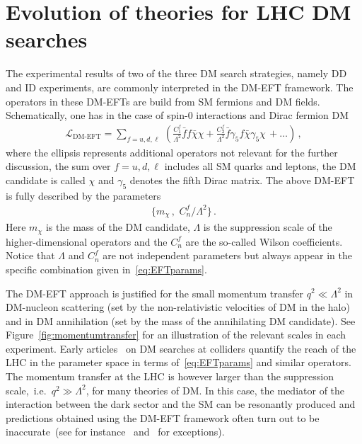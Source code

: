 \documentclass[a4paper, 11pt,notoc]{article}
\begin{document}

\section{Evolution of theories for LHC DM searches} 
\label{sec:evolution}

The experimental results of two of the three DM search strategies, namely DD and ID experiments, are commonly interpreted in the DM-EFT framework. The operators in these DM-EFTs are build from SM fermions and DM fields. Schematically, one has in the case of spin-0 interactions and Dirac fermion DM
\begin{align}\label{eq:EFT}
\mathcal{L}_\text{DM-EFT}= \sum_{f=u, d, \ell} \,\left(\frac{C_{1}^f}{\Lambda^2} \bar f f \bar \chi \chi  +\frac{C_{2}^f}{\Lambda^2} \bar  f \gamma_5 f \bar \chi\gamma_5 \chi \,+\ldots \right) \,, 
\end{align}
 where the ellipsis represents additional operators not relevant for the further discussion, the sum over $f=u,d,\ell$ includes all SM quarks and leptons, the DM candidate is called $\chi$  and $\gamma_5$ denotes the fifth Dirac matrix. The above DM-EFT is fully described by the parameters
\begin{align}\label{eq:EFTparams}
\big\{ m_\chi\,,\,\, C_n^f/\Lambda^2 \big\} \,.
\end{align}
Here $m_\chi$ is the mass of the DM candidate, $\Lambda$ is the suppression scale of the higher-dimensional operators and the $C_n^f$ are the so-called Wilson coefficients. Notice that $\Lambda$ and $C_n^f$ are not independent parameters but always appear in the specific combination given in~\eqref{eq:EFTparams}. 

The DM-EFT approach is justified for the small momentum transfer $q^2\ll \Lambda^2$ in DM-nucleon scattering (set by the non-relativistic velocities of DM in the halo) and in DM annihilation (set by the mass of the annihilating DM candidate). See Figure~\ref{fig:momentumtransfer} for an illustration of the relevant scales in each experiment. Early articles~\cite{Cao:2009uw,Beltran:2010ww,Goodman:2010yf,Bai:2010hh,Goodman:2010ku,Fox:2011pm} on DM searches at colliders quantify the reach of the LHC in the parameter space in terms of~\eqref{eq:EFTparams} and similar operators. The momentum transfer at the LHC is however larger than the suppression scale,~i.e.~$q^2 \gg \Lambda^2$, for many theories of DM.  In this case, the mediator of the interaction between the dark sector and the SM can be resonantly produced and predictions  obtained using the DM-EFT framework often turn out to be inaccurate~(see for instance~\cite{Bai:2010hh,Fox:2011fx,Shoemaker:2011vi,Busoni:2013lha,Buchmueller:2013dya,Busoni:2014sya,Busoni:2014haa,Racco:2015dxa} and~\cite{Bruggisser:2016nzw,Bruggisser:2016ixa} for exceptions). 
\end{document}
